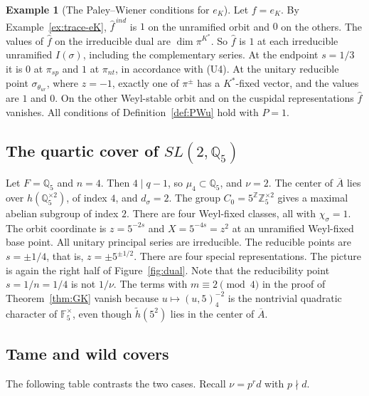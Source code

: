 \documentclass[12pt,letterpaper]{article}
\numberwithin{equation}{section}
\theoremstyle{definition}
\newtheorem{example}[theorem]{Example}
\newcommand{\Z}{\mathbb Z}
\newcommand{\Q}{\mathbb Q}
\newcommand{\bA}{\overline{A}}
\newcommand{\hl}{\tilde h}
\begin{document}
\begin{example}[The Paley--Wiener conditions for $e_K$]\label{ex:PW-Q7}
Let $f=e_K$.  By Example~\ref{ex:trace-eK}, $\hat f^{\,ind}$ is $1$ on the unramified
orbit and $0$ on the others.  The values of $\hat f$ on the irreducible dual are
$\dim\pi^{K^*}$.  So $\hat f$ is $1$ at each irreducible unramified $I(\sigma)$, including
the complementary series.  At the endpoint $s=1/3$ it is $0$ at $\pi_{sp}$ and $1$ at
$\pi_{nt}$, in accordance with (U4).  At the unitary reducible point
$\sigma_{\theta_{ur}}$, where $z=-1$, exactly one of $\pi^\pm$ has a $K^*$-fixed vector, and
the values are $1$ and $0$.  On the other Weyl-stable orbit and on the cuspidal
representations $\hat f$ vanishes.  All conditions of Definition~\ref{def:PWu} hold with
$P=1$.
\end{example}

\subsection{\texorpdfstring{The quartic cover of $SL(2,\Q_5)$}{The quartic cover of SL(2,Q5)}}

Let $F=\Q_5$ and $n=4$.  Then $4\mid q-1$, so $\mu_4\subset\Q_5$, and $\nu=2$.  The center of
$\bA$ lies over $h(\Q_5^{\times2})$, of index $4$, and $d_\sigma=2$.  The group
$C_0=5^{\Z}\Z_5^{\times2}$ gives a maximal abelian subgroup of index $2$.  There are four
Weyl-fixed classes, all with $\chi_\sigma=1$.  The orbit coordinate is $z=5^{-2s}$ and
$X=5^{-4s}=z^2$ at an unramified Weyl-fixed base point.  All unitary principal series are
irreducible.  The reducible points are $s=\pm1/4$, that is, $z=\pm5^{\pm1/2}$.  There are
four special representations.  The picture is again the right half of
Figure~\ref{fig:dual}.  Note that the reducibility point $s=1/n=1/4$ is not $1/\nu$.  The
terms with $m\equiv2\pmod4$ in the proof of Theorem~\ref{thm:GK} vanish because
$u\mapsto(u,5)_4^{-2}$ is the nontrivial quadratic character of $\mathbb F_5^\times$, even
though $\hl(5^2)$ lies in the center of $\bA$.

\subsection{Tame and wild covers}

The following table contrasts the two cases.  Recall $\nu=p^rd$ with $p\nmid d$.
\end{document}
